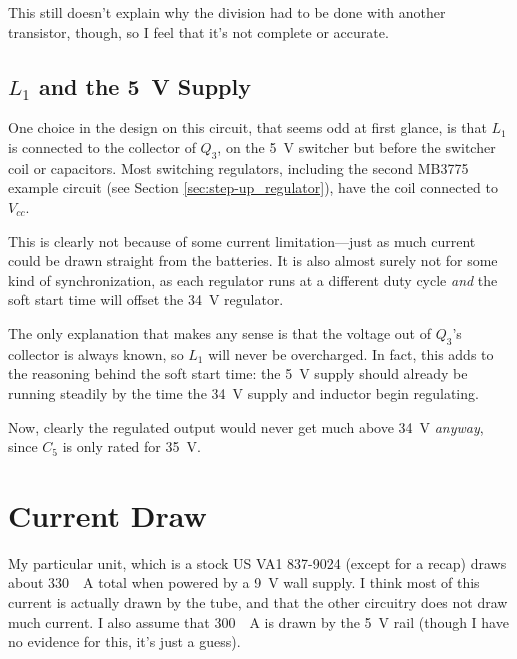\documentclass{article}
\newcommand{\Vcc}{$V_{cc}$}
\newcommand{\model}{\textsf}
\begin{document}
This still doesn't explain why the division had to be done with
another transistor, though, so I feel that it's not complete or
accurate.


\subsection{$L_1$ and the \qty{5}{\volt} Supply}
One choice in the design on this circuit, that seems odd at first
glance, is that $L_1$ is connected to the collector of $Q_3$, on the
\qty{5}{\volt} switcher but before the switcher coil or
capacitors. Most switching regulators, including the second
\model{MB3775} example circuit (see Section
\ref{sec:step-up_regulator}), have the coil connected to \Vcc{}.

This is clearly not because of some current limitation---just as much
current could be drawn straight from the batteries. It is also almost
surely not for some kind of synchronization, as each regulator runs at
a different duty cycle \textit{and} the soft start time will offset
the \qty{34}{\volt} regulator.

The only explanation that makes any sense is that the voltage out of
$Q_3$'s collector is always known, so $L_1$ will never be
overcharged. In fact, this adds to the reasoning behind the soft
start time: the \qty{5}{\volt} supply should already be running
steadily by the time the \qty{34}{\volt} supply and inductor begin
regulating.

Now, clearly the regulated output would never get much above
\qty{34}{\volt} \textit{anyway}, since $C_5$ is only rated for
\qty{35}{\volt}.
\section{Current Draw}
\label{sec:current_draw}
My particular unit, which is a stock US \model{VA1} 837-9024 (except for a
recap) draws about \qty{330}{\milli{}A} total when powered by a
\qty{9}{\volt} wall supply. I think most of this current is actually
drawn by the tube, and that the other circuitry does not draw much
current. I also assume that \qty{300}{\milli{}A} is drawn by the
\qty{5}{\volt} rail (though I have no evidence for this, it's just a
guess).
\end{document}
